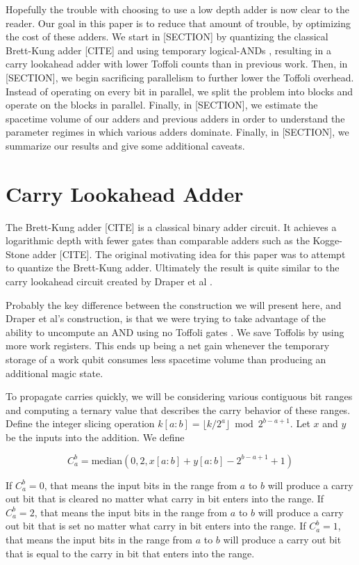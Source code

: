 \documentclass[onecolumn,unpublished]{quantumarticle}
\theoremstyle{definition}
\theoremstyle{definition}
\theoremstyle{definition}
\begin{document}
Hopefully the trouble with choosing to use a low depth adder is now clear to the reader.
Our goal in this paper is to reduce that amount of trouble, by optimizing the cost of these adders.
We start in [SECTION] by quantizing the classical Brett-Kung adder [CITE] and using temporary logical-ANDs \cite{gidney2018halving}, resulting in a carry lookahead adder with lower Toffoli counts than in previous work.
Then, in [SECTION], we begin sacrificing parallelism to further lower the Toffoli overhead.
Instead of operating on every bit in parallel, we split the problem into blocks and operate on the blocks in parallel.
Finally, in [SECTION], we estimate the spacetime volume of our adders and previous adders in order to understand the parameter regimes in which various adders dominate.
Finally, in [SECTION], we summarize our results and give some additional caveats.

\section{Carry Lookahead Adder}

The Brett-Kung adder [CITE] is a classical binary adder circuit.
It achieves a logarithmic depth with fewer gates than comparable adders such as the Kogge-Stone adder [CITE].
The original motivating idea for this paper was to attempt to quantize the Brett-Kung adder.
Ultimately the result is quite similar to the carry lookahead circuit created by Draper et al \cite{draper2004lookaheadadder}.

Probably the key difference between the construction we will present here, and Draper et al's construction, is that we were trying to take advantage of the ability to uncompute an AND using no Toffoli gates \cite{gidney2018halving}.
We save Toffolis by using more work registers.
This ends up being a net gain whenever the temporary storage of a work qubit consumes less spacetime volume than producing an additional magic state.

To propagate carries quickly, we will be considering various contiguous bit ranges and computing a ternary value that describes the carry behavior of these ranges.
Define the integer slicing operation $k[a:b] = \lfloor k/2^a \rfloor \bmod 2^{b-a+1}$.
Let $x$ and $y$ be the inputs into the addition.
We define

$$C_a^b = \text{median}(0, 2, x[a:b] + y[a:b] - 2^{b - a + 1} + 1)$$

If $C_a^b = 0$, that means the input bits in the range from $a$ to $b$ will produce a carry out bit that is cleared no matter what carry in bit enters into the range.
If $C_a^b = 2$, that means the input bits in the range from $a$ to $b$ will produce a carry out bit that is set no matter what carry in bit enters into the range.
If $C_a^b = 1$, that means the input bits in the range from $a$ to $b$ will produce a carry out bit that is equal to the carry in bit that enters into the range.
\end{document}
